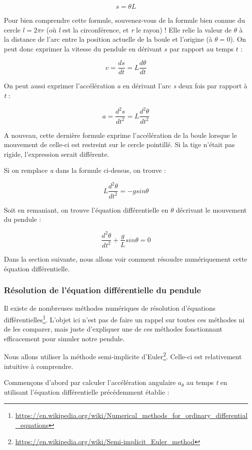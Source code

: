 \documentclass[a4paper,11pt,twoside]{book}
\renewcommand{\href}[2]{#2\footnote{\url{#1}}}
\begin{document}
\[s = \theta L\]

Pour bien comprendre cette formule, souvenez-vous de la formule bien
connue du cercle \(l = 2 \pi r\) (où \emph{l} est la circonférence, et
\emph{r} le rayon) ! Elle relie la valeur de \(\theta\) à la distance de
l'arc entre la position actuelle de la boule et l'origine (à
\(\theta = 0\)). On peut donc exprimer la vitesse du pendule en dérivant
\(s\) par rapport au temps \(t\) :

\[v = \frac{ds}{dt} = L\frac{d \theta}{dt}\]

On peut aussi exprimer l'accélération \emph{a} en dérivant l'arc
\emph{s} deux fois par rapport à \emph{t} :

\[a = \frac{d^2s}{dt^2} = L\frac{d^2 \theta}{dt^2}\]

A nouveau, cette dernière formule exprime l'accélération de la boule
lorsque le mouvement de celle-ci est restreint sur le cercle pointillé.
Si la tige n'était pas rigide, l'expression serait différente.

Si on remplace \emph{a} dans la formule ci-dessus, on trouve :

\[L \frac{d^2 \theta}{dt^2} = -g sin \theta\]

Soit en remaniant, on trouve l'équation différentielle en \(\theta\)
décrivant le mouvement du pendule :

\[\frac{d^2 \theta}{dt^2} + \frac{g}{L} sin \theta = 0\]

Dans la section suivante, nous allons voir comment résoudre
numériquement cette équation différentielle.

\subsubsection{Résolution de l'équation différentielle du
pendule}\label{ruxe9solution-de-luxe9quation-diffuxe9rentielle-du-pendule}

Il existe de nombreuses
\href{https://en.wikipedia.org/wiki/Numerical_methods_for_ordinary_differential_equations}{méthodes
numériques de résolution d'équations différentielles}. L'objet ici n'est
pas de faire un rappel sur toutes ces méthodes ni de les comparer, mais
juste d'expliquer une de ces méthodes fonctionnant efficacement pour
simuler notre pendule.

Nous allons utiliser la
\href{https://en.wikipedia.org/wiki/Semi-implicit_Euler_method}{méthode
semi-implicite d'Euler}. Celle-ci est relativement intuitive à
comprendre.

Commençons d'abord par calculer l'accélération angulaire \(a_{\theta}\)
au temps \emph{t} en utilisant l'équation différentielle précédemment
établie :
\end{document}
